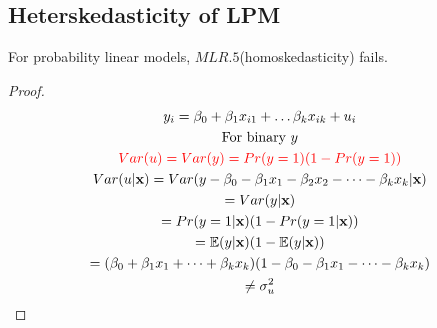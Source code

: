 \documentclass[]{article}
\begin{document}
		\subsection{Heterskedasticity of LPM}
			\begin{remark}
				For probability linear models, $MLR.5$(homoskedasticity) fails.
			\end{remark}
			\begin{proof}
				\begin{gather*}
					y_i = \beta_0 + \beta_1 x_{i1} + \dots \beta_k x_{ik} + u_i \\
					\text{{For binary $y$}} \\
					\textcolor{red}{
						Var(u) = Var(y) = Pr(y=1) (1-Pr(y=1))
					} \\
					Var(u|\textbf{x}) = Var(y - \beta_0 - \beta_1 x_1 - \beta_2 x_2 - \dots - \beta_k x_k | \textbf{x}) \\
					= Var(y | \textbf{x}) \\
					= Pr(y=1|\textbf{x}) (1-Pr(y=1|\textbf{x})) \\
					= \mathbb{E}({y | \textbf{x}}) (1 - \mathbb{E}({y | \textbf{x}})) \\
					= (\beta_0 + \beta_1 x_1 + \dots + \beta_k x_k) (1 - \beta_0 - \beta_1 x_1 - \dots - \beta_k x_k) \\
					\neq \sigma_u^2
				\end{gather*}
			\end{proof}
\end{document}
